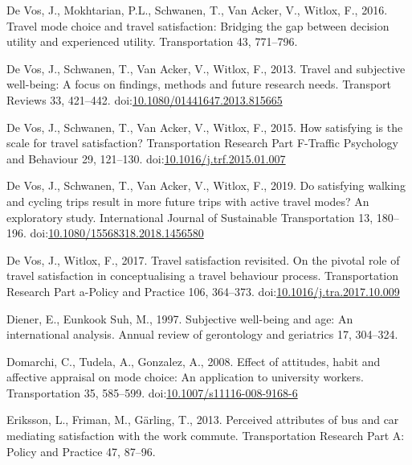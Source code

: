 \documentclass[]{elsarticle} %
\begin{document}
\leavevmode\hypertarget{ref-Devos2016travel}{}%
De Vos, J., Mokhtarian, P.L., Schwanen, T., Van Acker, V., Witlox, F.,
2016. Travel mode choice and travel satisfaction: Bridging the gap
between decision utility and experienced utility. Transportation 43,
771--796.

\leavevmode\hypertarget{ref-Devos2013travel}{}%
De Vos, J., Schwanen, T., Van Acker, V., Witlox, F., 2013. Travel and
subjective well-being: A focus on findings, methods and future research
needs. Transport Reviews 33, 421--442.
doi:\href{https://doi.org/10.1080/01441647.2013.815665}{10.1080/01441647.2013.815665}

\leavevmode\hypertarget{ref-Devos2015satisfying}{}%
De Vos, J., Schwanen, T., Van Acker, V., Witlox, F., 2015. How
satisfying is the scale for travel satisfaction? Transportation Research
Part F-Traffic Psychology and Behaviour 29, 121--130.
doi:\href{https://doi.org/10.1016/j.trf.2015.01.007}{10.1016/j.trf.2015.01.007}

\leavevmode\hypertarget{ref-Devos2019satisfying}{}%
De Vos, J., Schwanen, T., Van Acker, V., Witlox, F., 2019. Do satisfying
walking and cycling trips result in more future trips with active travel
modes? An exploratory study. International Journal of Sustainable
Transportation 13, 180--196.
doi:\href{https://doi.org/10.1080/15568318.2018.1456580}{10.1080/15568318.2018.1456580}

\leavevmode\hypertarget{ref-Devos2017travel}{}%
De Vos, J., Witlox, F., 2017. Travel satisfaction revisited. On the
pivotal role of travel satisfaction in conceptualising a travel
behaviour process. Transportation Research Part a-Policy and Practice
106, 364--373.
doi:\href{https://doi.org/10.1016/j.tra.2017.10.009}{10.1016/j.tra.2017.10.009}

\leavevmode\hypertarget{ref-Diener1997subjective}{}%
Diener, E., Eunkook Suh, M., 1997. Subjective well-being and age: An
international analysis. Annual review of gerontology and geriatrics 17,
304--324.

\leavevmode\hypertarget{ref-Domarchi2008effect}{}%
Domarchi, C., Tudela, A., Gonzalez, A., 2008. Effect of attitudes, habit
and affective appraisal on mode choice: An application to university
workers. Transportation 35, 585--599.
doi:\href{https://doi.org/10.1007/s11116-008-9168-6}{10.1007/s11116-008-9168-6}

\leavevmode\hypertarget{ref-Eriksson2013perceived}{}%
Eriksson, L., Friman, M., Gärling, T., 2013. Perceived attributes of bus
and car mediating satisfaction with the work commute. Transportation
Research Part A: Policy and Practice 47, 87--96.
\end{document}
